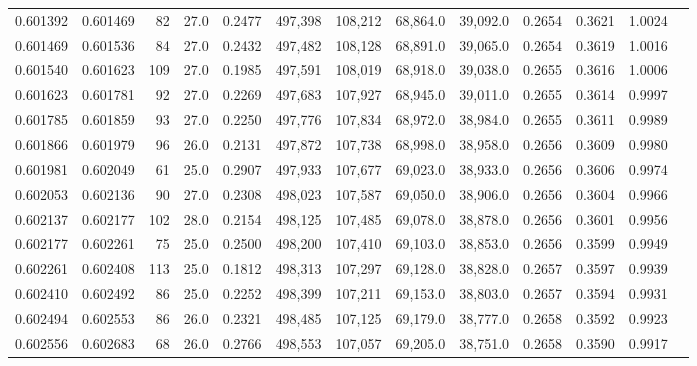 \begin{tabular}{rrrrrrrrrrrrr}
0.601392 & 0.601469 &    82 & 27.0 &                                     0.2477 & 497,398 & 108,212 &  68,864.0 &  39,092.0 & 0.2654 & 0.3621 & 1.0024 \\
0.601469 & 0.601536 &    84 & 27.0 &                                     0.2432 & 497,482 & 108,128 &  68,891.0 &  39,065.0 & 0.2654 & 0.3619 & 1.0016 \\
0.601540 & 0.601623 &   109 & 27.0 &                                     0.1985 & 497,591 & 108,019 &  68,918.0 &  39,038.0 & 0.2655 & 0.3616 & 1.0006 \\
0.601623 & 0.601781 &    92 & 27.0 &                                     0.2269 & 497,683 & 107,927 &  68,945.0 &  39,011.0 & 0.2655 & 0.3614 & 0.9997 \\
0.601785 & 0.601859 &    93 & 27.0 &                                     0.2250 & 497,776 & 107,834 &  68,972.0 &  38,984.0 & 0.2655 & 0.3611 & 0.9989 \\
0.601866 & 0.601979 &    96 & 26.0 &                                     0.2131 & 497,872 & 107,738 &  68,998.0 &  38,958.0 & 0.2656 & 0.3609 & 0.9980 \\
0.601981 & 0.602049 &    61 & 25.0 &                                     0.2907 & 497,933 & 107,677 &  69,023.0 &  38,933.0 & 0.2656 & 0.3606 & 0.9974 \\
0.602053 & 0.602136 &    90 & 27.0 &                                     0.2308 & 498,023 & 107,587 &  69,050.0 &  38,906.0 & 0.2656 & 0.3604 & 0.9966 \\
0.602137 & 0.602177 &   102 & 28.0 &                                     0.2154 & 498,125 & 107,485 &  69,078.0 &  38,878.0 & 0.2656 & 0.3601 & 0.9956 \\
0.602177 & 0.602261 &    75 & 25.0 &                                     0.2500 & 498,200 & 107,410 &  69,103.0 &  38,853.0 & 0.2656 & 0.3599 & 0.9949 \\
0.602261 & 0.602408 &   113 & 25.0 &                                     0.1812 & 498,313 & 107,297 &  69,128.0 &  38,828.0 & 0.2657 & 0.3597 & 0.9939 \\
0.602410 & 0.602492 &    86 & 25.0 &                                     0.2252 & 498,399 & 107,211 &  69,153.0 &  38,803.0 & 0.2657 & 0.3594 & 0.9931 \\
0.602494 & 0.602553 &    86 & 26.0 &                                     0.2321 & 498,485 & 107,125 &  69,179.0 &  38,777.0 & 0.2658 & 0.3592 & 0.9923 \\
0.602556 & 0.602683 &    68 & 26.0 &                                     0.2766 & 498,553 & 107,057 &  69,205.0 &  38,751.0 & 0.2658 & 0.3590 & 0.9917 \\

\end{tabular}
